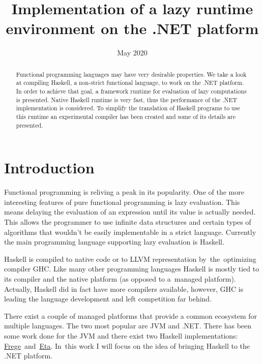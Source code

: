 \documentclass[en]{pracamgr}
\title{Implementation of a lazy runtime environment on the .NET platform}
\date{May 2020}
\begin{document}
\maketitle

\begin{abstract}
  Functional programming languages may have very desirable properties.
We take a look at compiling Haskell, a non-strict functional language,
to work on the .NET platform. In order to achieve that goal, a framework
runtime for evaluation of lazy computations is presented. Native Haskell
runtime is very fast, thus the performance of the .NET implementation is considered.
To simplify the translation
of Haskell programs to use this runtime an experimental compiler has been
created and some of its details are presented.
\end{abstract}

\tableofcontents

\chapter*{Introduction}

Functional programming is reliving a peak in its popularity.
One of the more interesting features of pure functional programming
is lazy evaluation. This means delaying the evaluation of an expression
until its value is actually needed. This allows the programmer to use
infinite data structures and certain types of algorithms that wouldn't
be easily implementable in a strict language.
Currently the main programming language
supporting lazy evaluation is Haskell.

Haskell is compiled to native code or to LLVM representation by~the~optimizing
compiler GHC. Like many other programming languages Haskell is mostly
tied to its compiler and the native platform (as opposed to a~managed platform).
Actually, Haskell did in fact have more compilers available, however,
GHC is leading the language development and left competition far behind.

There exist a couple of managed platforms that provide a common ecosystem
for multiple languages. The two most popular are JVM and .NET.
There has been some work done for the JVM \cite{Tullsen,Choi,Stewart}
and there exist two Haskell implementations: 
\href{https://github.com/Frege/frege}{Frege}~and~\href{https://eta-lang.org/}{Eta}.
In~this work I will focus on the idea of bringing
Haskell to the .NET platform.
\end{document}
